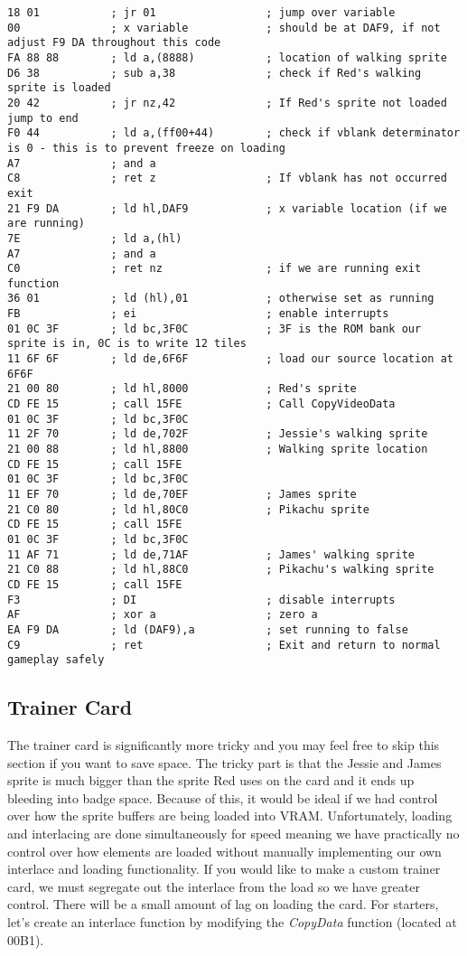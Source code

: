 \documentclass[../main.tex]{subfiles}
\begin{document}
    \begin{verbatim}
18 01           ; jr 01                 ; jump over variable
00              ; x variable            ; should be at DAF9, if not adjust F9 DA throughout this code
FA 88 88        ; ld a,(8888)           ; location of walking sprite
D6 38           ; sub a,38              ; check if Red's walking sprite is loaded
20 42           ; jr nz,42              ; If Red's sprite not loaded jump to end
F0 44           ; ld a,(ff00+44)        ; check if vblank determinator is 0 - this is to prevent freeze on loading
A7              ; and a
C8              ; ret z                 ; If vblank has not occurred exit
21 F9 DA        ; ld hl,DAF9            ; x variable location (if we are running)
7E              ; ld a,(hl)
A7              ; and a
C0              ; ret nz                ; if we are running exit function
36 01           ; ld (hl),01            ; otherwise set as running
FB              ; ei                    ; enable interrupts
01 0C 3F        ; ld bc,3F0C            ; 3F is the ROM bank our sprite is in, 0C is to write 12 tiles
11 6F 6F        ; ld de,6F6F            ; load our source location at 6F6F
21 00 80        ; ld hl,8000            ; Red's sprite
CD FE 15        ; call 15FE             ; Call CopyVideoData
01 0C 3F        ; ld bc,3F0C
11 2F 70        ; ld de,702F            ; Jessie's walking sprite
21 00 88        ; ld hl,8800            ; Walking sprite location
CD FE 15        ; call 15FE
01 0C 3F        ; ld bc,3F0C
11 EF 70        ; ld de,70EF            ; James sprite
21 C0 80        ; ld hl,80C0            ; Pikachu sprite
CD FE 15        ; call 15FE
01 0C 3F        ; ld bc,3F0C
11 AF 71        ; ld de,71AF            ; James' walking sprite
21 C0 88        ; ld hl,88C0            ; Pikachu's walking sprite
CD FE 15        ; call 15FE
F3              ; DI                    ; disable interrupts
AF              ; xor a                 ; zero a
EA F9 DA        ; ld (DAF9),a           ; set running to false
C9              ; ret                   ; Exit and return to normal gameplay safely
    \end{verbatim}

    \subsection{Trainer Card}
    The trainer card is significantly more tricky and you may feel free to skip this section if you want to save space.  The tricky part is that the Jessie and James sprite is much bigger than the sprite Red uses on the card and it ends up bleeding into badge space.  Because of this, it would be ideal if we had control over how the sprite buffers are being loaded into VRAM.  Unfortunately, loading and interlacing are done simultaneously for speed meaning we have practically no control over how elements are loaded without manually implementing our own interlace and loading functionality.  If you would like to make a custom trainer card, we must segregate out the interlace from the load so we have greater control.  There will be a small amount of lag on loading the card.  For starters, let's create an interlace function by modifying the \textit{CopyData} function (located at 00B1).
\end{document}
